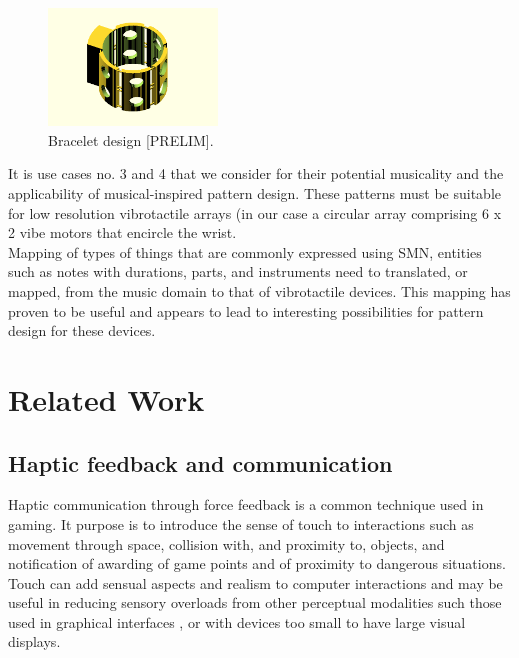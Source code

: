 \documentclass[a4paper, twocolumn]{article}
\begin{document}
\begin{figure}[htb]
    \begin{center}
        \includegraphics[width=0.4\textwidth]{graphics/bracelet-01.png}
    \end{center}
    \caption{Bracelet design [PRELIM].\label{fig:fig1}}
\end{figure}

It is use cases no. 3 and 4 that we consider for their potential musicality and the applicability of musical-inspired pattern design. These patterns must be suitable for low resolution vibrotactile arrays (in our case a circular array comprising 6 x 2 vibe motors that encircle the wrist.\\

Mapping of types of things that are commonly expressed using SMN, entities such as notes with durations, parts, and instruments need to translated, or mapped, from the music domain to that of vibrotactile devices. This mapping has proven to be useful and appears to lead to interesting possibilities for pattern design for these devices.   


\section{Related Work}

\subsection{Haptic feedback and communication}
Haptic communication through force feedback is a common technique used in gaming. It purpose is to introduce the sense of touch to interactions such as movement through space, collision with, and proximity to, objects, and notification of awarding of game points and of proximity to dangerous situations. Touch can add sensual aspects and realism to computer interactions and may be useful in reducing sensory overloads from other perceptual modalities such those used in graphical interfaces \cite{oakley2000putting}, or with devices too small to have large visual displays.\\
\end{document}
